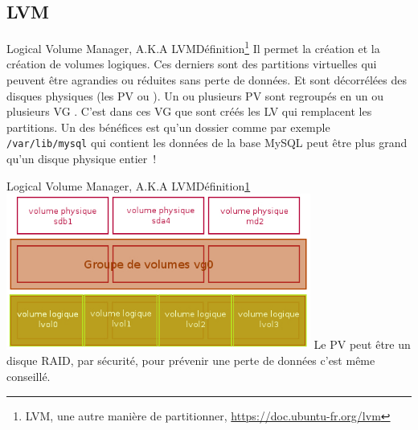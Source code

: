\documentclass{beamer}
\begin{document}
    \subsection{LVM}\label{subsec:lvm}

    \begin{frame}{Logical Volume Manager, A.K.A LVM}{Définition\footnote{\label{lvm}LVM, une autre manière de partitionner, \url{https://doc.ubuntu-fr.org/lvm}}}
        Il permet la création et la création de volumes logiques.
        Ces derniers sont des partitions virtuelles qui peuvent être agrandies ou réduites sans perte de données.
        Et sont décorrélées des disques physiques (les PV ou ).
        \bigbreak
        Un ou plusieurs PV sont regroupés en un ou plusieurs VG .
        \bigbreak
        C'est dans ces VG que sont créés les LV  qui remplacent les partitions.
        \bigbreak
        Un des bénéfices est qu'un dossier comme par exemple \lstinline{/var/lib/mysql} qui contient les données de la base MySQL peut être plus grand qu'un disque physique entier~!
    \end{frame}

    \begin{frame}{Logical Volume Manager, A.K.A LVM}{Définition\cref{lvm}}
        \centering
        \includegraphics[width=10cm]{image/lvm}
        \flushleft
        Le PV peut être un disque RAID, par sécurité, pour prévenir une perte de données c'est même conseillé.
    \end{frame}
\end{document}
